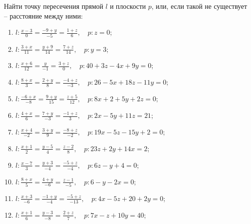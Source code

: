 	\vspace{15pt}
	Найти точку пересечения прямой $l$ и плоскости $p$, или, если такой не существует -- расстояние между ними:

	\begin{enumerate}
		\setcounter{enumi}{\value{tasks}}

			\item \( \displaystyle l: \frac{x-3}{0} = \frac{-9+y}{-5} = \frac{1+z}{6}, \quad p: z = 0 \);
			\item \( \displaystyle l: \frac{3+x}{11} = \frac{y+9}{14} = \frac{7+z}{14}, \quad p: y = 3 \);
			\item \( \displaystyle l: \frac{x+6}{12} = \frac{y}{-1} = \frac{3+z}{0}, \quad p: 40+3z-4x+9y = 0 \);
			\item \( \displaystyle l: \frac{8+x}{3} = \frac{2+y}{8} = \frac{-4+z}{-3}, \quad p: 26-5x+18z-11y = 0 \);
			\item \( \displaystyle l: \frac{-6+x}{-8} = \frac{9+y}{15} = \frac{z+5}{12}, \quad p: 8x+2+5y+2z = 0 \);
			\item \( \displaystyle l: \frac{4+x}{6} = \frac{7+y}{-3} = \frac{-1+z}{3}, \quad p: 2x-5y+11z = 21 \);
			\item \( \displaystyle l: \frac{x+4}{-2} = \frac{3+y}{9} = \frac{-8+z}{-2}, \quad p: 19x-5z-15y+2 = 0 \);
			\item \( \displaystyle l: \frac{x+1}{2} = \frac{y-5}{4} = \frac{z-2}{8}, \quad p: 23z+2y+14x = 2 \);
			\item \( \displaystyle l: \frac{x-7}{3} = \frac{y+3}{-4} = \frac{-5+z}{-4}, \quad p: 6z-y+4 = 0 \);
			\item \( \displaystyle l: \frac{8+x}{5} = \frac{4+y}{-6} = \frac{z-1}{-5}, \quad p: 6-y-2x = 0 \);
			\item \( \displaystyle l: \frac{x+3}{-6} = \frac{-1+y}{-4} = \frac{-5+z}{-13}, \quad p: 4x-5z+20+2y = 0 \);
			\item \( \displaystyle l: \frac{x+1}{6} = \frac{y-3}{-8} = \frac{2+z}{7}, \quad p: 7x-z+10y = 40 \);

		\setcounter{tasks}{\value{enumi}}
	\end{enumerate}

